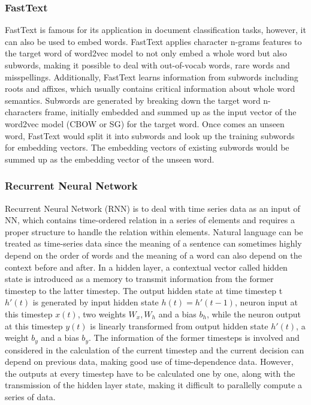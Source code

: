 \subsubsection{FastText}
FastText\cite{bojanowski2016} is famous for its application in document classification tasks, however, it can also be used to embed words.
FastText applies character n-grams features to the target word of word2vec model to not only embed a whole word but also subwords, making it possible to deal with out-of-vocab words, rare words and misspellings.
Additionally, FastText learns information from subwords including roots and affixes, which usually contains critical information about whole word semantics.
Subwords are generated by breaking down the target word n-characters frame, initially embedded and summed up as the input vector of the word2vec model (CBOW or SG) for the target word.
Once comes an unseen word, FastText would split it into subwords and look up the training subwords for embedding vectors.
The embedding vectors of existing subwords would be summed up as the embedding vector of the unseen word.

\subsubsection{Recurrent Neural Network}
Recurrent Neural Network (RNN) is to deal with time series data as an input of NN, which contains time-ordered relation in a series of elements and requires a proper structure to handle the relation within elements.
Natural language can be treated as time-series data since the meaning of a sentence can sometimes highly depend on the order of words and the meaning of a word can also depend on the context before and after\cite{mikolov2011extensions}.
In a hidden layer, a contextual vector called hidden state is introduced as a memory to transmit information from the former timestep to the latter timestep.
The output hidden state at time timestep t $h'(t)$ is generated by input hidden state $h(t) = h'(t-1)$, neuron input at this timestep $x(t)$, two weights $W_x, W_h$ and a bias $b_h$, while the neuron output at this timestep $y(t)$ is linearly transformed from output hidden state $h'(t)$, a weight $b_y$ and a bias $b_y$.
The information of the former timesteps is involved and considered in the calculation of the current timestep and the current decision can depend on previous data, making good use of time-dependence data.
However, the outputs at every timestep have to be calculated one by one, along with the transmission of the hidden layer state, making it difficult to parallelly compute a series of data.

